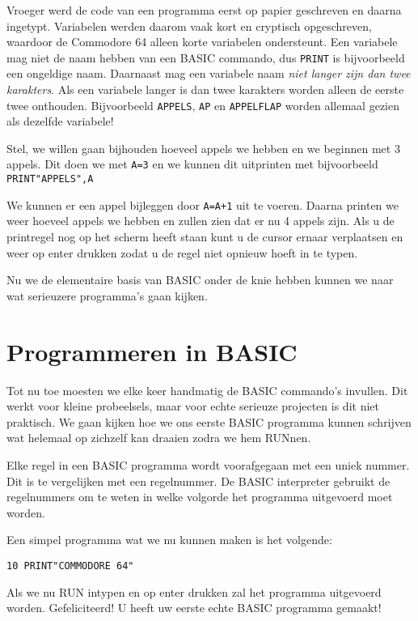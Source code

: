 \documentclass{article}
\begin{document}
Vroeger werd de code van een programma eerst op papier geschreven en daarna ingetypt.
Variabelen werden daarom vaak kort en cryptisch opgeschreven, waardoor de Commodore 64 alleen korte variabelen ondersteunt.
Een variabele mag niet de naam hebben van een BASIC commando, dus \verb:PRINT: is bijvoorbeeld een ongeldige naam.
Daarnaast mag een variabele naam \emph{niet langer zijn dan twee karakters}.
Als een variabele langer is dan twee karakters worden alleen de eerste twee onthouden.
Bijvoorbeeld \verb:APPELS:, \verb:AP: en \verb:APPELFLAP: worden allemaal gezien als dezelfde variabele!

Stel, we willen gaan bijhouden hoeveel appels we hebben en we beginnen met 3 appels.
Dit doen we met \verb:A=3: en we kunnen dit uitprinten met bijvoorbeeld \verb:PRINT"APPELS",A:

We kunnen er een appel bijleggen door \verb:A=A+1: uit te voeren.
Daarna printen we weer hoeveel appels we hebben en zullen zien dat er nu 4 appels zijn.
Als u de printregel nog op het scherm heeft staan kunt u de cursor ernaar verplaatsen en weer op enter drukken zodat u de regel niet opnieuw hoeft in te typen.

Nu we de elementaire basis van BASIC onder de knie hebben kunnen we naar wat serieuzere programma's gaan kijken.

\section{Programmeren in BASIC}

Tot nu toe moesten we elke keer handmatig de BASIC commando's invullen.
Dit werkt voor kleine probeelsels, maar voor echte serieuze projecten is dit niet praktisch.
We gaan kijken hoe we ons eerste BASIC programma kunnen schrijven wat helemaal op zichzelf kan draaien zodra we hem RUNnen.

Elke regel in een BASIC programma wordt voorafgegaan met een uniek nummer.
Dit is te vergelijken met een regelnummer.
De BASIC interpreter gebruikt de regelnummers om te weten in welke volgorde het programma uitgevoerd moet worden.

Een simpel programma wat we nu kunnen maken is het volgende:

\begin{lstlisting}
10 PRINT"COMMODORE 64"
\end{lstlisting}

Als we nu RUN intypen en op enter drukken zal het programma uitgevoerd worden.
Gefeliciteerd! U heeft uw eerste echte BASIC programma gemaakt!
\end{document}
